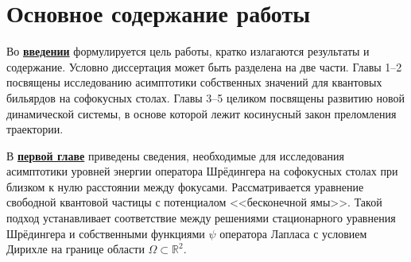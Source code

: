 \section*{Основное содержание работы}
Во \underline{\textbf{введении}} формулируется цель работы, кратко излагаются результаты и содержание. 
Условно диссертация может быть разделена на две части. Главы 1--2 посвящены исследованию асимптотики собственных значений для квантовых бильярдов на софокусных столах. Главы 3--5 целиком посвящены развитию новой динамической системы, в основе которой лежит косинусный закон преломления траектории.


В \underline{\textbf{первой главе}} приведены сведения, необходимые для исследования асимптотики уровней энергии оператора Шрёдингера на софокусных столах при близком к нулю расстоянии между фокусами.
Рассматривается уравнение свободной квантовой частицы с потенциалом <<бесконечной ямы>>. Такой подход устанавливает соответствие между  решениями стационарного уравнения Шрёдингера и собственными  функциями $\psi$ оператора Лапласа с условием Дирихле на границе области $\Omega \subset \mathbb{R}^2$.

